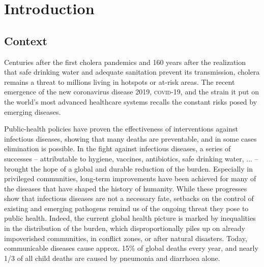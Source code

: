 \chapter*{Introduction} 
 \section{Context}
 Centuries after the first cholera pandemics and 160 years after the realization that safe drinking water and adequate sanitation prevent its transmission, cholera remains a threat to millions living in hotspots or at-risk areas. The recent emergence of the new coronavirus disease 2019, \textsc{covid}-19, and the strain it put on the world's most advanced healthcare systems recalls the constant risks posed by emerging diseases. 
 
 Public-health policies have proven the effectiveness of interventions against infectious diseases, showing that many deaths are preventable, and in some cases elimination is possible. In the fight against infectious diseases, a series of successes -- attributable to \eg hygiene, vaccines, antibiotics, safe drinking water, ... -- brought the hope of a global and durable reduction of the burden. Especially in privileged communities, long-term improvements have been achieved for many of the diseases that have shaped the history of humanity. While these progresses show that infectious diseases are not a necessary fate, setbacks on the control of existing and emerging pathogens remind us of the ongoing threat they pose to public health. 
  Indeed, the current global health picture is marked by inequalities in the distribution of the burden, which disproportionally piles up on already impoverished communities, in conflict zones, or after natural disasters. Today, communicable diseases cause approx. 15\% of global deaths every year\cite[-4\baselineskip][tab. 1, excl. non-transmissible neonatal and maternal diseases and nutritional diseases; pre-\textsc{covid}-19 estimates]{Roth:GlobalRegionalNational:2018}, and nearly 1/3 of all child deaths are caused by pneumonia and diarrhoea alone\cite[][\textsc{m} deaths among under 5, every year.]{WHO:EndingPreventableChild:2013}.  
  
